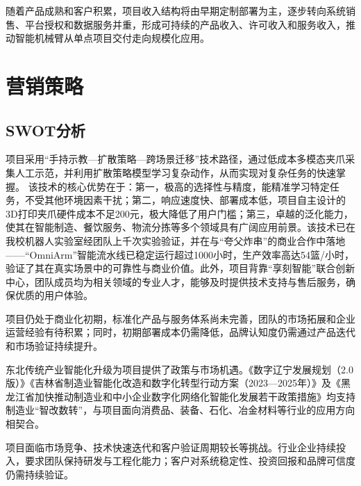 \documentclass[zihao=-4]{ctexart}
\begin{document}
随着产品成熟和客户积累，项目收入结构将由早期定制部署为主，逐步转向系统销售、平台授权和数据服务并重，形成可持续的产品收入、许可收入和服务收入，推动智能机械臂从单点项目交付走向规模化应用。


\section{营销策略}

\subsection{SWOT分析}

项目采用“手持示教—扩散策略—跨场景迁移”技术路径，通过低成本多模态夹爪采集人工示范，并利用扩散策略模型学习复杂动作，从而实现对复杂任务的快速掌握。
该技术的核心优势在于：第一，极高的选择性与精度，能精准学习特定任务，不受其他环境因素干扰；第二，响应速度快、部署成本低，项目自主设计的3D打印夹爪硬件成本不足200元，极大降低了用户门槛；第三，卓越的泛化能力，使其在智能制造、餐饮服务、物流分拣等多个领域具有广阔应用前景。该技术已在我校机器人实验室经团队上千次实验验证，并在与“夸父炸串”的商业合作中落地——“OmniArm”智能流水线已稳定运行超过1000小时，生产效率高达54篮/小时，验证了其在真实场景中的可靠性与商业价值。此外，项目背靠“享刻智能”联合创新中心，团队成员均为相关领域的专业人才，能够及时提供技术支持与售后服务，确保优质的用户体验。

项目仍处于商业化初期，标准化产品与服务体系尚未完善，团队的市场拓展和企业运营经验有待积累；同时，初期部署成本仍需降低，品牌认知度仍需通过产品迭代和市场验证持续提升。

东北传统产业智能化升级为项目提供了政策与市场机遇。《数字辽宁发展规划（2.0版）》《吉林省制造业智能化改造和数字化转型行动方案（2023—2025年）》及《黑龙江省加快推动制造业和中小企业数字化网络化智能化发展若干政策措施》\cite{ref18,ref19,ref20}均支持制造业“智改数转”，与项目面向消费品、装备、石化、冶金材料等行业的应用方向相契合。

项目面临市场竞争、技术快速迭代和客户验证周期较长等挑战。行业企业持续投入，要求团队保持研发与工程化能力；客户对系统稳定性、投资回报和品牌可信度仍需持续验证。
\end{document}
